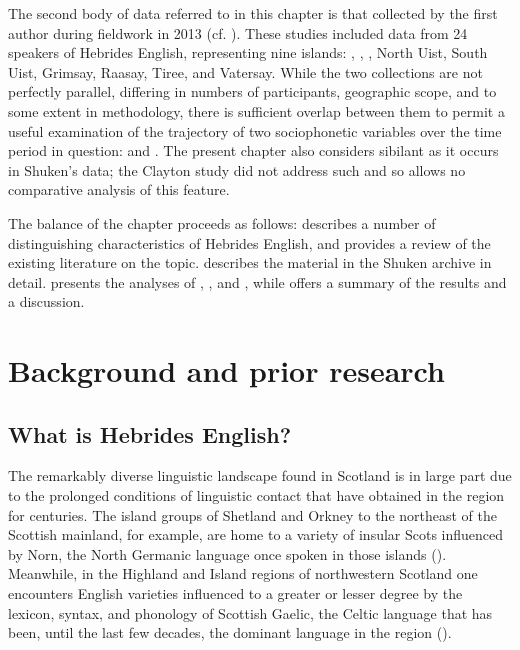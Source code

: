 \documentclass[output=paper,colorlinks,citecolor=brown]{langscibook}
\begin{document}
\largerpage
The second body of data referred to in this chapter is that collected by the first author during fieldwork in 2013 (cf. \cite{Clayton:2015, Clayton:2017, Clayton:2018}). These studies included data from 24 speakers of Hebrides English, representing nine islands: , , , North Uist, South Uist, Grimsay, Raasay, Tiree, and Vatersay. While the two collections are not perfectly parallel, differing in numbers of participants, geographic scope, and to some extent in methodology, there is sufficient overlap between them to permit a useful examination of the trajectory of two sociophonetic variables over the time period in question:  and . The present chapter also considers sibilant  as it occurs in Shuken’s data; the Clayton study did not address such  and so allows no comparative analysis of this feature. 

The balance of the chapter proceeds as follows:  describes a number of distinguishing characteristics of Hebrides English, and provides a review of the existing literature on the topic.  describes the material in the Shuken archive in detail.  presents the analyses of , , and , while  offers a summary of the results and a discussion. 


\section{Background and prior research}\label{backgroundandpriorresearch}

\subsection{What is Hebrides English?}

The remarkably diverse linguistic landscape found in Scotland is in large part due to the prolonged conditions of linguistic contact that have obtained in the region for centuries.  The island groups of Shetland and Orkney to the northeast of the Scottish mainland, for example, are home to a variety of insular Scots influenced by Norn, the North Germanic language once spoken in those islands (\citealt{Melchers:2008, McClure:1994, Barnes:1984, Wells:1982, Catford:1957a}). Meanwhile, in the Highland and Island regions of northwestern Scotland one encounters English varieties influenced to a greater or lesser degree by the lexicon, syntax, and phonology of Scottish Gaelic, the Celtic language that has been, until the last few decades, the dominant language in the region (\citealt{McClure:1994, Shuken:1984, Shuken:1985, Clement:1997, Stuart-Smith:2008, Clayton:2017, Clayton:2018}). 
\end{document}
